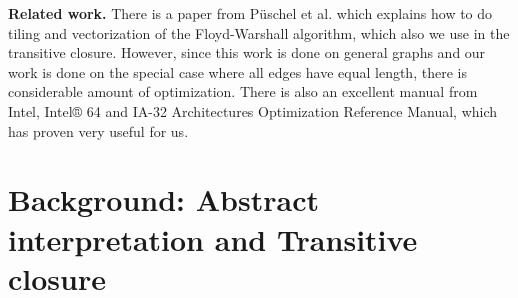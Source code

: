 \documentclass[letterpaper]{article}
\newcommand{\mypar}[1]{{\bf #1.}}
\begin{document}
\mypar{Related work} There is a paper from P\"uschel et al. which explains how to do tiling and vectorization of the Floyd-Warshall algorithm, which also we use in the transitive closure. However, since this work is done on general graphs and our work is done on the special case where all edges have equal length, there is considerable amount of optimization. There is also an excellent manual from Intel, Intel® 64 and IA-32 Architectures Optimization Reference Manual\cite{IntelManual}, which has proven very useful for us. 

%
%
%

\section{Background: Abstract interpretation and Transitive closure}\label{sec:background}
\end{document}
